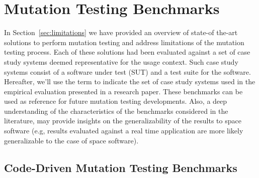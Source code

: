 
\chapter{Mutation Testing Benchmarks}
\label{chapter:industry}

In Section~\ref{sec:limitations} we have provided an overview of state-of the-art solutions to perform mutation testing and address limitations of the mutation testing process.
Each of these solutions had been evaluated against a set of case study systems deemed representative for the usage context. Such case study systems consist of a software under test (SUT) and a test suite for the software.
Hereafter, we'll use the term  to indicate the set of case study systems used in the empirical evaluation presented in a research paper.
These benchmarks can be used as reference for future mutation testing developments. 
Also, a deep understanding of the characteristics of the benchmarks considered in the literature, may provide insights on the generalizability of the results to space software (e.g, results evaluated against a real time application are more likely generalizable to the case of space software).





\section{Code-Driven Mutation Testing Benchmarks}
\label{section:industry:code}


